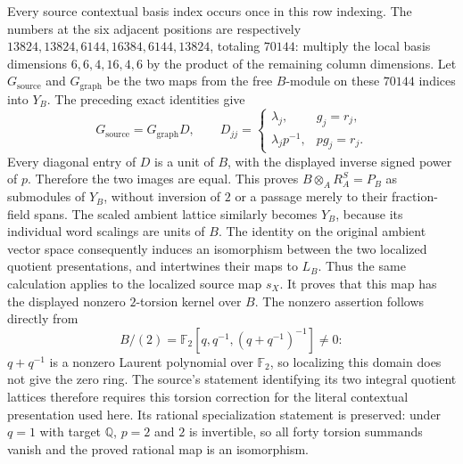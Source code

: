 Every source contextual basis index occurs once in
this row indexing. The numbers at the six adjacent
positions are respectively
$13824,13824,6144,16384,6144,13824$, totaling $70144$:
multiply the local basis dimensions $6,6,4,16,4,6$
by the product of the remaining column dimensions.
Let $G_{\mathrm{source}}$ and $G_{\mathrm{graph}}$
be the two maps from the free $B$-module on these
$70144$ indices into $Y_B$. The preceding exact
identities give
\[
 G_{\mathrm{source}}=G_{\mathrm{graph}}D,\qquad
 D_{jj}=\begin{cases}
   \lambda_j,&g_j=r_j,\\
   \lambda_jp^{-1},&pg_j=r_j.
 \end{cases}
\]
Every diagonal entry of $D$ is a unit of $B$, with
the displayed inverse signed power of $p$. Therefore
the two images are equal. This proves
$B\otimes_A R_A^S=P_B$ as submodules of $Y_B$,
without inversion of $2$ or a passage merely to their
fraction-field spans. The scaled ambient lattice
similarly becomes $Y_B$, because its individual word
scalings are units of $B$. The identity on the
original ambient vector space consequently induces
an isomorphism between the two localized quotient
presentations, and intertwines their maps to $L_B$.
Thus the same calculation applies to the localized
source map $s_X$.
It proves that this map has the displayed nonzero
$2$-torsion kernel over $B$. The nonzero assertion follows
directly from
\[
 B/(2)=\mathbb F_2[q,q^{-1},(q+q^{-1})^{-1}]\ne0:
\]
$q+q^{-1}$ is a nonzero Laurent polynomial over
$\mathbb F_2$, so localizing this domain does not give
the zero ring. The source's statement identifying its
two integral quotient lattices therefore requires this
torsion correction for the literal contextual
presentation used here. Its rational specialization
statement is preserved: under $q=1$ with target
$\mathbb Q$, $p=2$ and $2$ is invertible, so all forty
torsion summands vanish and the proved rational map is
an isomorphism.
